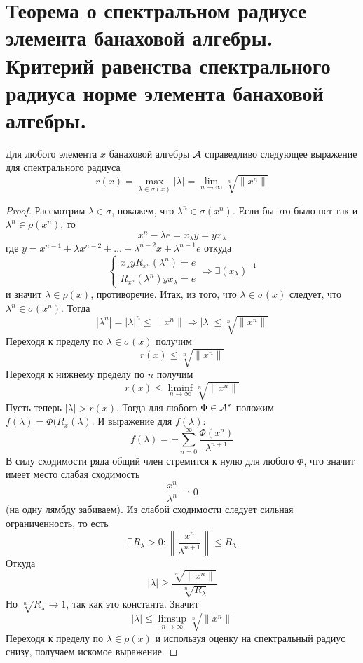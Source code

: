 \newpage
\section{Теорема о спектральном радиусе элемента банаховой алгебры. Критерий равенства спектрального радиуса норме элемента банаховой алгебры.}
\begin{theorem}
	Для любого элемента $x$ банаховой алгебры $\mathcal{A}$ справедливо следующее выражение для спектрального радиуса
	$$
	r(x) = \max_{\lambda \in \sigma(x)} |\lambda| = \lim\limits_{n \to \infty} \sqrt[n]{\|x^n\|}
	$$
\end{theorem}
\begin{proof}
	Рассмотрим $\lambda \in \sigma$, покажем, что $\lambda^n \in \sigma(x^n)$. Если бы это было нет так и $\lambda^n \in \rho(x^n)$, то 
	$$
	x^n - \lambda e = x_\lambda y = y x_\lambda 
	$$
	где $y = x^{n-1} + \lambda x^{n-2} + \dots + \lambda^{n-2} x + \lambda^{n-1} e$ откуда
	$$
	\begin{cases}
		x_\lambda y R_{x^n}(\lambda^n) = e \\
		R_{x^n}(\lambda^n) y x_\lambda = e
	\end{cases} \Rightarrow \exists (x_\lambda)^{-1}
	$$
	и значит $\lambda \in \rho(x)$, противоречие. Итак, из того, что $\lambda \in \sigma(x)$ следует, что $\lambda^n \in \sigma(x^n)$. Тогда 
	$$
	|\lambda^n|  = |\lambda|^n \leq \|x^n\| \Rightarrow |\lambda| \leq \sqrt[n]{\|x^n\|}
	$$
	Переходя к пределу по $\lambda \in \sigma(x)$ получим
	$$
	r(x) \leq \sqrt[n]{\|x^n\|}
	$$
	Переходя к нижнему пределу по $n$ получим
	$$
	r(x) \leq \liminf_{n \to \infty} \sqrt[n]{\|x^n\|} 
	$$
	Пусть теперь $|\lambda| > r(x)$. Тогда для любого $\Phi \in \mathcal{A}^*$ положим $f(\lambda)= \Phi(R_x(\lambda)$. И выражение для $f(\lambda)$:
	$$
	f(\lambda) = -\sum_{n=0}^\infty\frac{\Phi(x^n)}{\lambda^{n+1}}
	$$
	В силу сходимости ряда общий член стремится к нулю для любого $\Phi$, что значит имеет место слабая сходимость
	$$
	\frac{x^n}{\lambda^{n}} \rightharpoonup 0
	$$
	(на одну лямбду забиваем). Из слабой сходимости следует сильная ограниченность, то есть 
	$$
	\exists R_\lambda > 0\colon \left\| \frac{x^n}{\lambda^{n+1}}\right\| \leq R_\lambda
	$$
	Откуда 
	$$
	|\lambda| \geq \frac{\sqrt[n]{\|x^n\|}}{\sqrt[n]{R_\lambda}}
	$$
	Но $\sqrt[n]{R_\lambda} \to 1$, так как это константа. Значит 
	$$
	|\lambda| \leq \limsup_{n \to \infty} \sqrt[n]{\|x^n\|}
	$$
	Переходя к пределу по $\lambda\in \rho(x)$ и используя оценку на спектральный радиус снизу, получаем искомое выражение.
\end{proof} 
